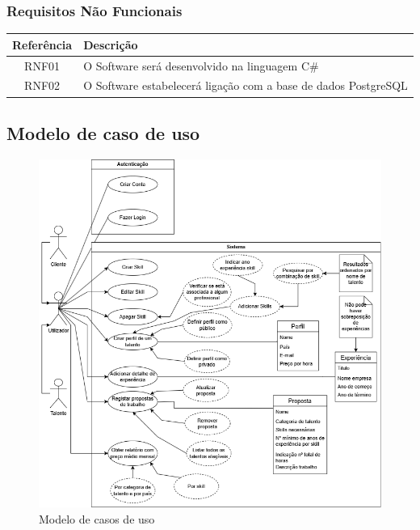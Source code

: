 \subsubsection{Requisitos Não Funcionais}

\renewcommand{\arraystretch}{1.3}
\begin{center} %
\begin{longtable}{|c|p{11.35cm}|} %
    \hline
    \textbf{Referência} & \textbf{Descrição} \\
    \hline
    RNF01 & O Software será desenvolvido na linguagem C\# \\
    \hline
    RNF02 & O Software estabelecerá ligação com a base de dados PostgreSQL \\
    \hline
\end{longtable}
\end{center}

\newpage

\subsection{Modelo de caso de uso}
\begin{figure}[h]
    \centering
    \includegraphics[width=1\linewidth]{imagens/casosdeuso.drawio.png}
    \caption{Modelo de casos de uso}
    \label{fig:1}
\end{figure}

